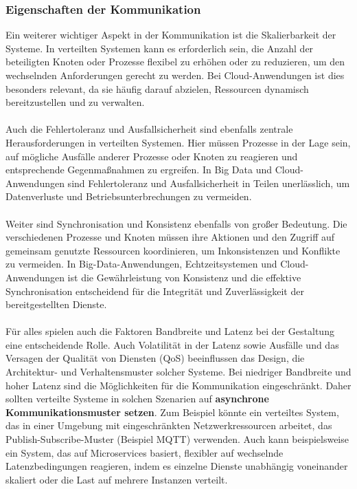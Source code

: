 \documentclass[../vs-script-first-v01.tex]{subfiles}
\begin{document}
\subsubsection{Eigenschaften der Kommunikation}
Ein weiterer wichtiger Aspekt in der Kommunikation ist die Skalierbarkeit der Systeme. In verteilten Systemen kann es erforderlich sein, die Anzahl der beteiligten Knoten oder Prozesse flexibel zu erhöhen oder zu reduzieren, um den wechselnden Anforderungen gerecht zu werden. Bei Cloud-Anwendungen ist dies besonders relevant, da sie häufig darauf abzielen, Ressourcen dynamisch bereitzustellen und zu verwalten.
\\\\
Auch die Fehlertoleranz und Ausfallsicherheit sind ebenfalls zentrale Herausforderungen in verteilten Systemen. Hier müssen Prozesse in der Lage sein, auf mögliche Ausfälle anderer Prozesse oder Knoten zu reagieren und entsprechende Gegenmaßnahmen zu ergreifen. In Big Data und Cloud-Anwendungen sind Fehlertoleranz und Ausfallsicherheit in Teilen unerlässlich, um Datenverluste und Betriebsunterbrechungen zu vermeiden.
\\\\
Weiter sind Synchronisation und Konsistenz ebenfalls von großer Bedeutung. Die verschiedenen Prozesse und Knoten müssen ihre Aktionen und den Zugriff auf gemeinsam genutzte Ressourcen koordinieren, um Inkonsistenzen und Konflikte zu vermeiden. In Big-Data-Anwendungen, Echtzeitsystemen und Cloud-Anwendungen ist die Gewährleistung von Konsistenz und die effektive Synchronisation entscheidend für die Integrität und Zuverlässigkeit der bereitgestellten Dienste.
\\\\
Für alles spielen auch die Faktoren Bandbreite und Latenz bei der Gestaltung eine entscheidende Rolle. Auch Volatilität in der Latenz sowie Ausfälle und das Versagen der Qualität von Diensten (QoS) beeinflussen das Design, die Architektur- und Verhaltensmuster solcher Systeme. Bei niedriger Bandbreite und hoher Latenz sind die Möglichkeiten für die Kommunikation eingeschränkt. Daher sollten verteilte Systeme in solchen Szenarien auf \textbf{asynchrone Kommunikationsmuster setzen}. Zum Beispiel könnte ein verteiltes System, das in einer Umgebung mit eingeschränkten Netzwerkressourcen arbeitet, das Publish-Subscribe-Muster (Beispiel MQTT) verwenden. Auch kann beispielsweise ein System, das auf Microservices basiert, flexibler auf wechselnde Latenzbedingungen reagieren, indem es einzelne Dienste unabhängig voneinander skaliert oder die Last auf mehrere Instanzen verteilt.
\end{document}
